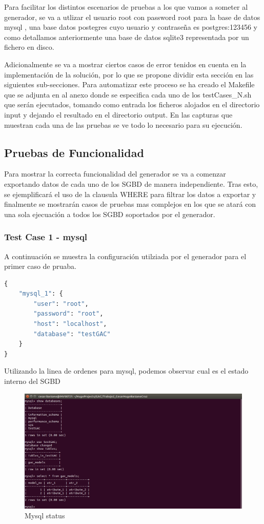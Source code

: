 \documentclass[a4paper,11pt]{book}
\begin{document}
Para facilitar los distintos escenarios de pruebas a los que vamos a someter al generador, se va a utlizar el usuario root con password root para la base de datos mysql , una base datos postegres cuyo usuario y contraseña es postgres:123456 y como detallamos anteriormente una base de datos sqlite3 representada por un fichero en disco.


Adicionalmente se va a mostrar ciertos casos de error tenidos en cuenta en la implementación de la solución, por lo que se propone dividir esta sección en las siguientes sub-secciones. Para automatizar este proceso se ha creado el Makefile que se adjunta en al anexo donde se especifica cada uno de los testCases\_N.sh que serán ejecutados, tomando como entrada los ficheros alojados en el directorio input y dejando el resultado en el directorio output. En las capturas que muestran cada una de las pruebas se ve todo lo necesario para su ejecución.  

\subsection{Pruebas de Funcionalidad}
Para mostrar la correcta funcionalidad del generador se va a comenzar exportando datos de cada uno de los SGBD de manera independiente. Tras esto, se ejemplificará el uso de la clausula WHERE para filtrar los datos a exportar y finalmente se mostrarán casos de pruebas mas complejos en los que se atará con una sola ejecuación a todos los SGBD soportados por el generador.  

\subsubsection{Test Case 1 - mysql}

A continuación se muestra la configuración utilziada por el generador para el primer caso de pruaba. 

\begin{lstlisting}[language=python,caption={make testServlet }]
 {
	"mysql_1": {
		"user": "root",
		"password": "root",
		"host": "localhost",
		"database": "testGAC"
	}
}
\end{lstlisting}

Utilizando la linea de ordenes para mysql, podemos observar cual es el estado interno del SGBD

\begin{figure}[H]  
\centering 
\includegraphics[scale=0.35]{imagenes/TestCase1_mysql.png}
\caption{ Mysql status  }  
\end{figure} 
\end{document}
